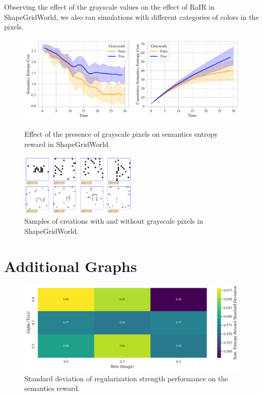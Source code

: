 Observing the effect of the grayscale values on the effect of RaIR in ShapeGridWorld, we also ran simulations with different categories of colors in the pixels.

\begin{figure}
    \centering
    \includegraphics[width=\textwidth]{images/mode_comparison_sgw.pdf}
    \caption{Effect of the presence of grayscale pixels on semantics entropy reward in ShapeGridWorld.}
    \label{fig:mode-sgw}
    \vspace{12pt}
    \includegraphics[width=0.5\textwidth]{images/mode_samples_sgw.pdf}
    \caption{Samples of creations with and without grayscale pixels in ShapeGridWorld.}
    \label{fig:mode-samples-sgw}
\end{figure}





\chapter{Additional Graphs}
\label{sec:additional-graphs}

\begin{figure}
    \centering
    \includegraphics[width=\textwidth]{images/alpha_beta-semantics_std_rair.pdf}
    \caption{Standard deviation of regularization strength performance on the semantics reward.}
    \label{fig:alpha_beta-semantics_std_rair}
\end{figure}


